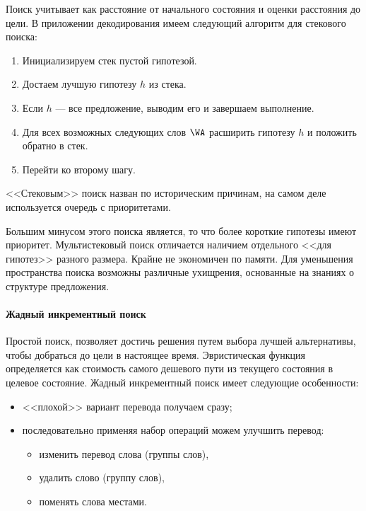 Поиск учитывает как расстояние от начального состояния и оценки расстояния до цели.
В приложении декодирования имеем следующий алгоритм для стекового поиска:
\begin{enumerate}
	\item Инициализируем стек пустой гипотезой.
	\item Достаем лучшую гипотезу $h$ из стека.
	\item Если $h$ --- все предложение, выводим его и завершаем выполнение.
	\item Для всех возможных следующих слов $\WA$ расширить гипотезу $h$ и положить обратно в стек.
	\item Перейти ко второму шагу.	
\end{enumerate}
<<Стековым>> поиск назван по историческим причинам, 
на самом деле используется очередь с приоритетами.

Большим минусом этого поиска является, то что более короткие гипотезы имеют приоритет.
Мультистековый поиск отличается наличием отдельного <<для гипотез>> разного размера.
Крайне не экономичен по памяти. Для уменьшения пространства поиска возможны различные ухищрения,
основанные на знаниях о структуре предложения.

\pagebreak

\paragraph{Жадный инкрементный поиск}

Простой поиск, 
позволяет достичь решения путем выбора лучшей альтернативы, 
чтобы добраться до цели в настоящее время.
Эвристическая функция определяется как стоимость самого дешевого пути 
из текущего состояния в целевое состояние.
Жадный инкрементный поиск имеет следующие особенности:
\begin{itemize}
	\item {<<плохой>> вариант перевода получаем сразу};
	\item последовательно применяя набор операций можем улучшить перевод:
	\begin{itemize}	
		\item изменить перевод слова (группы слов),
		\item удалить слово (группу слов),
		\item поменять слова местами.
	\end{itemize} 
\end{itemize} 

